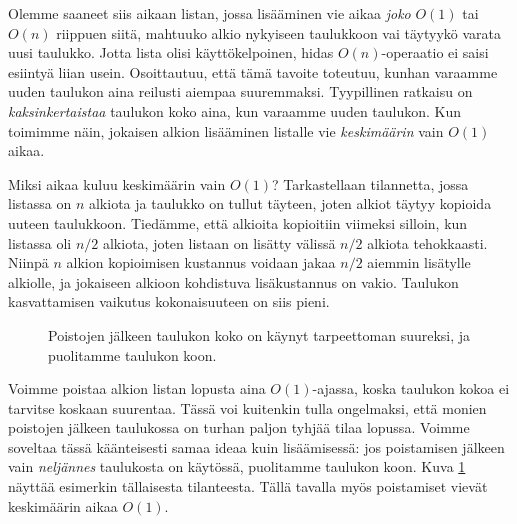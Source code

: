 Olemme saaneet siis aikaan listan, jossa lisääminen
vie aikaa \emph{joko} $O(1)$ tai $O(n)$ riippuen siitä,
mahtuuko alkio nykyiseen taulukkoon vai täytyykö
varata uusi taulukko.
Jotta lista olisi käyttökelpoinen, hidas $O(n)$-operaatio
ei saisi esiintyä liian usein.
Osoittautuu, että tämä tavoite toteutuu,
kunhan varaamme uuden taulukon aina reilusti aiempaa suuremmaksi.
Tyypillinen ratkaisu on \emph{kaksinkertaistaa} taulukon koko aina,
kun varaamme uuden taulukon.
Kun toimimme näin, jokaisen alkion lisääminen listalle vie
\emph{keskimäärin} vain $O(1)$ aikaa.

Miksi aikaa kuluu keskimäärin vain $O(1)$?
Tarkastellaan tilannetta, jossa listassa on $n$ alkiota
ja taulukko on tullut täyteen,
joten alkiot täytyy kopioida uuteen taulukkoon.
Tiedämme, että alkioita kopioitiin viimeksi silloin,
kun listassa oli $n/2$ alkiota,
joten listaan on lisätty välissä $n/2$ alkiota tehokkaasti.
Niinpä $n$ alkion kopioimisen kustannus voidaan jakaa
$n/2$ aiemmin lisätylle alkiolle, ja jokaiseen alkioon
kohdistuva lisäkustannus on vakio.
Taulukon kasvattamisen vaikutus kokonaisuuteen on siis pieni.

\begin{figure}
\center
{}
\caption{Poistojen jälkeen taulukon koko on käynyt tarpeettoman suureksi,
ja puolitamme taulukon koon.}                                                                        
\label{fig:lispoi}
\end{figure}

Voimme poistaa alkion listan lopusta aina $O(1)$-ajassa,
koska taulukon kokoa ei tarvitse koskaan suurentaa.
Tässä voi kuitenkin tulla ongelmaksi, että monien poistojen
jälkeen taulukossa on turhan paljon tyhjää tilaa lopussa.
Voimme soveltaa tässä käänteisesti samaa ideaa kuin lisäämisessä:
jos poistamisen jälkeen vain \emph{neljännes} taulukosta on käytössä,
puolitamme taulukon koon.
Kuva \ref{fig:lispoi} näyttää esimerkin tällaisesta tilanteesta.
Tällä tavalla myös poistamiset vievät keskimäärin aikaa $O(1)$.

